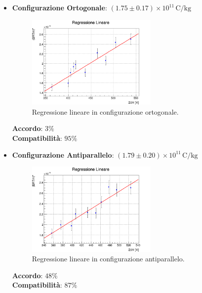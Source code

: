 \documentclass[a4paper,12pt]{article}
\begin{document}
\begin{itemize}
    \item \textbf{Configurazione Ortogonale}: \( (1.75 \pm 0.17) \times 10^{11} \, \text{C/kg}\)
    \begin{figure}[H]
        \centering
        \includegraphics[width=0.6\textwidth]{regr_ortogonale.png}
        \caption{Regressione lineare in configurazione ortogonale.}
        \label{fig:regr_ortogonale}
    \end{figure}
    \textbf{Accordo}: \(3\%\) \\
    \textbf{Compatibilità}: \(95\%\)
    \vspace{0.5cm}

    \item \textbf{Configurazione Antiparallelo}: \( (1.79 \pm 0.20) \times 10^{11} \, \text{C/kg}\)
    \begin{figure}[H]
        \centering
        \includegraphics[width=0.6\textwidth]{regr_antiparallelo.png}
        \caption{Regressione lineare in configurazione antiparallelo.}
        \label{fig:regr_antiparallelo}
    \end{figure}
    \textbf{Accordo}: \(48\%\) \\
    \textbf{Compatibilità}: \(87\%\)
    \vspace{0.5cm}


\end{itemize}
\end{document}
